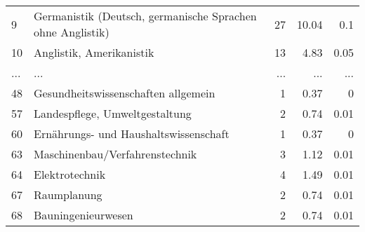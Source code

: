\begin{longtable}{lXrrr}
        9 & \multicolumn{1}{X}{Germanistik (Deutsch, germanische Sprachen ohne Anglistik)} & %
          \num{27} &
          \num[round-mode=places,round-precision=2]{10.04} &
          \num[round-mode=places,round-precision=2]{0.1} \\
        10 & \multicolumn{1}{X}{Anglistik, Amerikanistik} & %
          \num{13} &
          \num[round-mode=places,round-precision=2]{4.83} &
          \num[round-mode=places,round-precision=2]{0.05} \\
       ... & ... & ... & ... & ... \\
        48 & \multicolumn{1}{X}{Gesundheitswissenschaften allgemein} & %
          \num{1} &
          \num[round-mode=places,round-precision=2]{0.37} &
          \num[round-mode=places,round-precision=2]{0} \\

        57 & \multicolumn{1}{X}{Landespflege, Umweltgestaltung} & %
          \num{2} &
          \num[round-mode=places,round-precision=2]{0.74} &
          \num[round-mode=places,round-precision=2]{0.01} \\

        60 & \multicolumn{1}{X}{Ernährungs- und Haushaltswissenschaft} & %
          \num{1} &
          \num[round-mode=places,round-precision=2]{0.37} &
          \num[round-mode=places,round-precision=2]{0} \\

        63 & \multicolumn{1}{X}{Maschinenbau/Verfahrenstechnik} & %
          \num{3} &
          \num[round-mode=places,round-precision=2]{1.12} &
          \num[round-mode=places,round-precision=2]{0.01} \\

        64 & \multicolumn{1}{X}{Elektrotechnik} & %
          \num{4} &
          \num[round-mode=places,round-precision=2]{1.49} &
          \num[round-mode=places,round-precision=2]{0.01} \\

        67 & \multicolumn{1}{X}{Raumplanung} & %
          \num{2} &
          \num[round-mode=places,round-precision=2]{0.74} &
          \num[round-mode=places,round-precision=2]{0.01} \\

        68 & \multicolumn{1}{X}{Bauningenieurwesen} & %
          \num{2} &
          \num[round-mode=places,round-precision=2]{0.74} &
          \num[round-mode=places,round-precision=2]{0.01} \\


\end{longtable}
